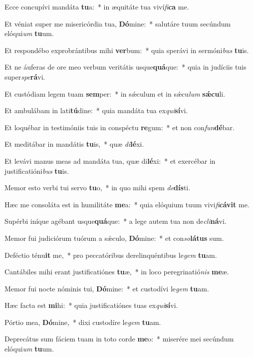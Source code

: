\item Ecce concupívi mandáta \textbf{tu}a:~* in æquitáte tua viví\textit{fi}\textbf{ca} me.
\item Et véniat super me misericórdia tua, \textbf{Dó}mine:~* salutáre tuum secúndum elóqui\textit{um} \textbf{tu}um.
\item Et respondébo exprobrántibus mihi \textbf{ver}bum:~* quia sperávi in sermóni\textit{bus} \textbf{tu}is.
\item Et ne áuferas de ore meo verbum veritátis usque\textbf{quá}que:~* quia in judíciis tuis super\textit{spe}\textbf{rá}vi.
\item Et custódiam legem tuam \textbf{sem}per:~* in sǽculum et in sǽcu\textit{lum} \textbf{sǽ}\textbf{cu}li.
\item Et ambulábam in lati\textbf{tú}dine:~* quia mandáta tua ex\textit{qui}\textbf{sí}vi.
\item Et loquébar in testimóniis tuis in conspéctu \textbf{re}gum:~* et non con\textit{fun}\textbf{dé}bar.
\item Et meditábar in mandátis \textbf{tu}is,~* quæ \textit{di}\textbf{lé}xi.
\item Et levávi manus meas ad mandáta tua, quæ di\textbf{lé}xi:~* et exercébar in justificatióni\textit{bus} \textbf{tu}is.
\item Memor esto verbi tui servo \textbf{tu}o,~* in quo mihi spem \textit{de}\textbf{dís}ti.
\item Hæc me consoláta est in humilitáte \textbf{me}a:~* quia elóquium tuum vivi\textit{fi}\textbf{cá}\textbf{vit} me.
\item Supérbi iníque agébant usque\textbf{quá}que:~* a lege autem tua non de\textit{cli}\textbf{ná}vi.
\item Memor fui judiciórum tuórum a sǽculo, \textbf{Dó}mine:~* et con\textit{so}\textbf{lá}\textbf{tus} sum.
\item Deféctio ténu\textbf{it} me,~* pro peccatóribus derelinquéntibus le\textit{gem} \textbf{tu}am.
\item Cantábiles mihi erant justificatiónes \textbf{tu}æ,~* in loco peregrinatió\textit{nis} \textbf{me}æ.
\item Memor fui nocte nóminis tui, \textbf{Dó}mine:~* et custodívi le\textit{gem} \textbf{tu}am.
\item Hæc facta est \textbf{mi}hi:~* quia justificatiónes tuas ex\textit{qui}\textbf{sí}vi.
\item Pórtio mea, \textbf{Dó}mine,~* dixi custodíre le\textit{gem} \textbf{tu}am.
\item Deprecátus sum fáciem tuam in toto corde \textbf{me}o:~* miserére mei secúndum elóqui\textit{um} \textbf{tu}um.
